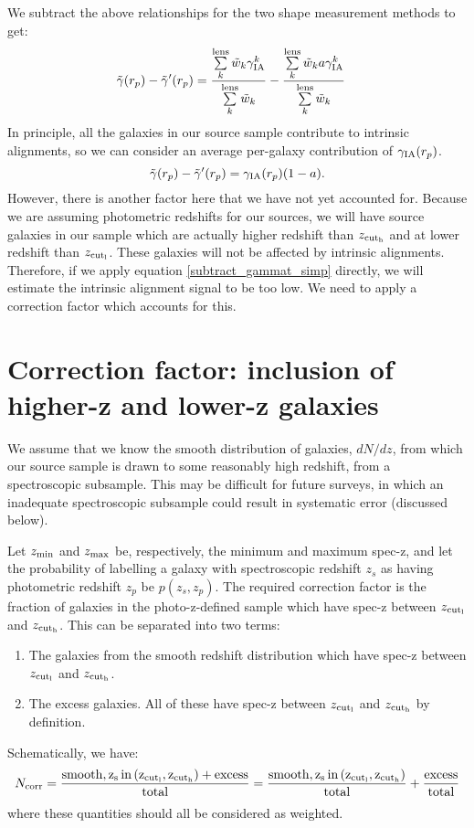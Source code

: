 \documentclass[onecolumn,amsmath,aps,fleqn, superscriptaddress]{revtex4}
\begin{document}
We subtract the above relationships for the two shape measurement methods to get:
\begin{align}
\tilde{\gamma}(r_p) - \tilde{\gamma}^\prime(r_p) &= \frac{\sum\limits_{k}^{\rm lens} \tilde{w}_k \gamma_{\rm IA}^k}{\sum\limits_{k}^{\rm lens} \tilde{w}_k} - \frac{\sum\limits_{k}^{\rm lens} \tilde{w}_k a \gamma_{\rm IA}^k}{\sum\limits_{k}^{\rm lens} \tilde{w}_k} 
\label{subtract_gammat}
\end{align}
In principle, all the galaxies in our source sample contribute to intrinsic alignments, so we can consider an average per-galaxy contribution of $\gamma_{\rm IA}(r_p)$.
\begin{equation}
\tilde{\gamma}(r_p) - \tilde{\gamma}^\prime(r_p) = \gamma_{\rm IA}(r_p)(1-a).
\label{subtract_gammat_simp}
\end{equation}
However, there is another factor here that we have not yet accounted for. Because we are assuming photometric redshifts for our sources, we will have source galaxies in our sample which are actually higher redshift than $z_{\rm cut_h}$ and at lower redshift than $z_{\rm cut_l}$. These galaxies will not be affected by intrinsic alignments. Therefore, if we apply equation \ref{subtract_gammat_simp} directly, we will estimate the intrinsic alignment signal to be too low. We need to apply a correction factor which accounts for this. 

\section*{Correction factor: inclusion of higher-z and lower-z galaxies}
We assume that we know the smooth distribution of galaxies, $dN / dz$, from which our source sample is drawn to some reasonably high redshift, from a spectroscopic subsample. This may be difficult for future surveys, in which an inadequate spectroscopic subsample could result in systematic error (discussed below). 

Let $z_{\rm min}$ and $z_{\rm max}$ be, respectively, the minimum and maximum spec-z, and let the probability of labelling a galaxy with spectroscopic redshift $z_s$ as having photometric redshift $z_p$ be $p(z_s, z_p)$. The required correction factor is the fraction of galaxies in the photo-z-defined sample which have spec-z between $z_{\rm cut_l}$ and $z_{\rm cut_h}$. This can be separated into two terms:
\begin{enumerate}
\item{The galaxies from the smooth redshift distribution which have spec-z between $z_{\rm cut_l}$ and $z_{\rm cut_h}$.}
\item{The excess galaxies. All of these have spec-z between $z_{\rm cut_l}$ and $z_{\rm cut_h}$ by definition.}
\end{enumerate}
Schematically, we have:
\begin{equation}
N_{\rm corr} = \frac{{\rm smooth, z_s \, in \, (z_{\rm cut_l}, z_{\rm cut_h})} + {\rm excess}}{{\rm total}} =  \frac{{\rm smooth, z_s \, in \, (z_{\rm cut_l}, z_{\rm cut_h})}}{{\rm total}} + \frac{{\rm excess}}{{\rm total}}
\label{schematic}
\end{equation}
where these quantities should all be considered as weighted. 
\end{document}
